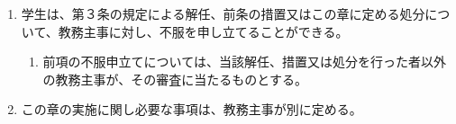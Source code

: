 \begin{enumerate}[label=第\arabic*条　]
\begin{enumerate}[label=\arabic*　,start=2,leftmargin=*]
    \end{enumerate}
  \item 学生は、第３条の規定による解任、前条の措置又はこの章に定める処分について、教務主事に対し、不服を申し立てることができる。
    \begin{enumerate}[label=\arabic*　,start=2,leftmargin=*]
      \item 前項の不服申立てについては、当該解任、措置又は処分を行った者以外の教務主事が、その審査に当たるものとする。
    \end{enumerate}
  \item この章の実施に関し必要な事項は、教務主事が別に定める。
\end{enumerate}
